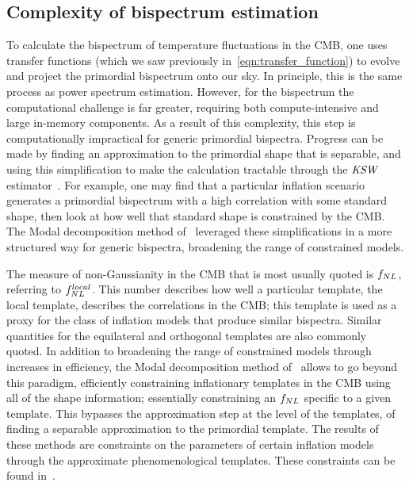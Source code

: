     \subsection{Complexity of bispectrum estimation}
To calculate the bispectrum of temperature fluctuations in the CMB, 
one uses transfer functions
(which we saw previously in~\eqref{eqn:transfer_function})
to evolve and project the primordial bispectrum onto our sky.
In principle, this is the same process as power spectrum estimation.
However, for the bispectrum the computational challenge is far greater,
requiring both compute-intensive and large in-memory components.
As a result of this complexity, this step is computationally impractical for generic primordial bispectra.
Progress can be made by finding an approximation to the primordial shape
that is separable, and using this simplification
to make the calculation tractable
through the ${\textit{\text{KSW}}}$ estimator~\cite{Komatsu_2005, Munchmeyer_2014, Smith_2011}.
For example, one may find that a particular inflation scenario generates
a primordial bispectrum with a high correlation with some standard shape,
then look at how well that standard shape is constrained by the CMB.
The Modal decomposition method of~\cite{FergShell_1,FergShell_2,FergShell_3}
leveraged these simplifications in a more structured way
for generic bispectra, broadening the range of constrained models.


The measure of non-Gaussianity in the CMB that is
most usually quoted is $f_{NL}$, referring to $f^{local}_{NL}$.
This number describes how well a particular template, the local template,
describes the correlations in the CMB;
this template is used as a proxy for the class of inflation models that produce similar bispectra.
Similar quantities for the equilateral and orthogonal templates are also
commonly quoted.
In addition to broadening the range of constrained models through increases in efficiency,
the Modal decomposition method of~\cite{FergShell_1,FergShell_2,FergShell_3}
allows to go beyond this paradigm, efficiently constraining inflationary templates in the CMB using
all of the shape information; essentially constraining an $f_{NL}$
specific to a given template. This bypasses the approximation step at the level of the templates,
of finding a separable approximation to the primordial template.
The results of these methods are constraints on the parameters of
certain inflation models through the approximate phenomenological templates.
These constraints can be found in~\cite{Planck_NG_2015, Planck_NG_2018}.


